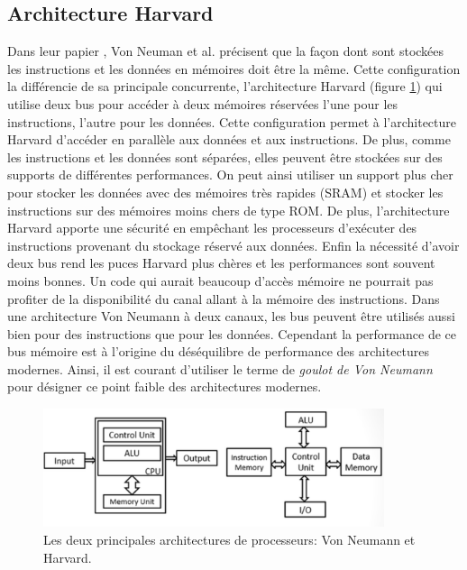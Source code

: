 \subsection{Architecture Harvard}\label{sec:harvard}

Dans leur papier \cite{238389}, Von Neuman et al. précisent que la façon dont sont stockées les instructions et les données en mémoires doit être la même. Cette configuration la différencie de sa principale concurrente, l'architecture  Harvard (figure \ref{pic_neumannHarvard}) qui utilise deux bus pour accéder à deux mémoires réservées l'une pour les instructions, l'autre pour les données. 
Cette configuration permet à l'architecture Harvard d'accéder en parallèle aux données et aux instructions. De plus, comme les instructions et les données sont séparées, elles peuvent être stockées sur des supports de différentes performances. On peut ainsi utiliser un support plus cher pour stocker les données avec des mémoires très rapides (SRAM) et stocker les instructions sur des mémoires moins chers de type ROM. De plus, l’architecture Harvard apporte une sécurité en empêchant les processeurs d’exécuter des instructions provenant du stockage réservé aux données. Enfin la nécessité d’avoir deux bus rend les puces Harvard plus chères et les performances sont souvent moins bonnes. Un code qui aurait beaucoup d’accès mémoire ne pourrait pas profiter de la disponibilité du canal allant à la mémoire des instructions. Dans une architecture Von Neumann à deux canaux, les bus peuvent être utilisés aussi bien pour des instructions que pour les données. Cependant la performance de ce bus mémoire est à l’origine du déséquilibre de performance des architectures modernes. Ainsi, il est courant d’utiliser le terme de \textit{goulot de Von Neumann} pour désigner ce point faible des architectures modernes.

\begin{figure}
    \center
    \includegraphics[width=10cm]{images/Chapitre1/neumannHarvard.png}
    \caption{\label{pic_neumannHarvard} Les deux principales architectures de processeurs: Von Neumann et Harvard. }
\end{figure}